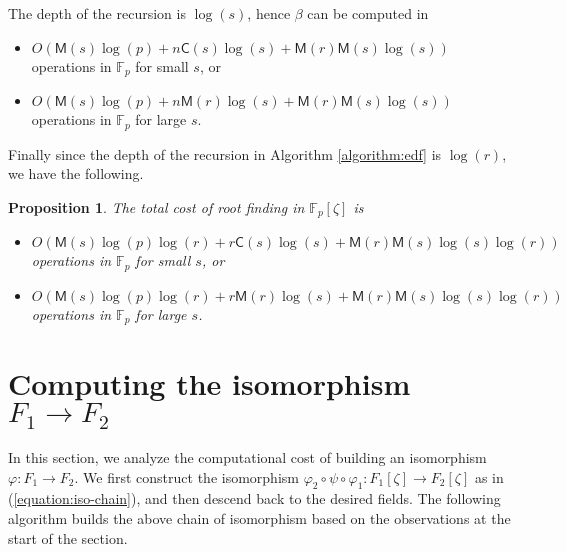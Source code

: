 \documentclass[12pt]{article}
\theoremstyle{plain}
\newtheorem{proposition}[theorem]{Proposition}
\theoremstyle{definition}
\def\F{\mathbb{F}}
\def\M{\mathsf{M}}
\def\CC{\mathsf{C}}
\newcounter{algorithm}
\begin{document}
The depth of the recursion is $\log(s)$, hence $\beta$ can be computed in
\begin{itemize}
	\item $O(\M(s)\log(p) + n\CC(s)\log(s) + \M(r)\M(s)\log(s))$ operations in $\F_p$ for small $s$, or
	\item $O(\M(s)\log(p) + n\M(r)\log(s) + \M(r)\M(s)\log(s))$ operations in $\F_p$ for large $s$.
\end{itemize} 
Finally since the depth of the recursion in Algorithm \ref{algorithm:edf} is $\log(r)$, we have the following.
\begin{proposition}
\label{proposition:root-fpz}
	The total cost of root finding in $\F_p[\zeta]$ is
	\begin{itemize}
		\item $O(\M(s)\log(p)\log(r) + r\CC(s)\log(s) + \M(r)\M(s)\log(s)\log(r))$\\ operations in $\F_p$ for small $s$, or
		\item $O(\M(s)\log(p)\log(r) + r\M(r)\log(s) + \M(r)\M(s)\log(s)\log(r))$\\ operations in $\F_p$ for large $s$.
	\end{itemize}
\end{proposition}






\section{Computing the isomorphism $F_1 \rightarrow F_2$}

In this section, we analyze the computational cost of building an isomorphism $\varphi: F_1 \rightarrow F_2$. We first construct
the isomorphism $\varphi_2 \circ \psi \circ \varphi_1 : F_1[\zeta] \rightarrow F_2[\zeta]$ as in (\ref{equation:iso-chain}), and
then descend back to the desired fields. The following algorithm builds the above chain of isomorphism based on the observations
at the start of the section. 
\end{document}

